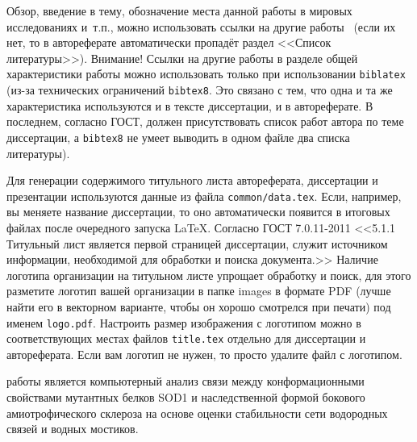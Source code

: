 
{\actuality} Обзор, введение в тему, обозначение места данной работы в
мировых исследованиях и~т.\:п., можно использовать ссылки на другие
работы~\cite{Gosele1999161} (если их нет, то в автореферате
автоматически пропадёт раздел <<Список литературы>>). Внимание! Ссылки
на другие работы в разделе общей характеристики работы можно
использовать только при использовании \verb!biblatex! (из-за технических
ограничений \verb!bibtex8!. Это связано с тем, что одна и та же
характеристика используются и в тексте диссертации, и в
автореферате. В последнем, согласно ГОСТ, должен присутствовать список
работ автора по теме диссертации, а \verb!bibtex8! не умеет выводить в одном
файле два списка литературы).

Для генерации содержимого титульного листа автореферата, диссертации и
презентации используются данные из файла \verb!common/data.tex!. Если,
например, вы меняете название диссертации, то оно автоматически
появится в итоговых файлах после очередного запуска \LaTeX. Согласно
ГОСТ 7.0.11-2011 <<5.1.1 Титульный лист является первой страницей
диссертации, служит источником информации, необходимой для обработки и
поиска документа.>> Наличие логотипа организации на титульном листе
упрощает обработку и поиск, для этого разметите логотип вашей
организации в папке images в формате PDF (лучше найти его в векторном
варианте, чтобы он хорошо смотрелся при печати) под именем
\verb!logo.pdf!. Настроить размер изображения с логотипом можно в
соответствующих местах файлов \verb!title.tex!  отдельно для
диссертации и автореферата. Если вам логотип не нужен, то просто
удалите файл с логотипом.


{\aim} работы является компьютерный анализ связи между конформационными свойствами мутантных белков SOD1 и наследственной формой бокового амиотрофического склероза на основе оценки стабильности сети водородных связей и водных мостиков.

